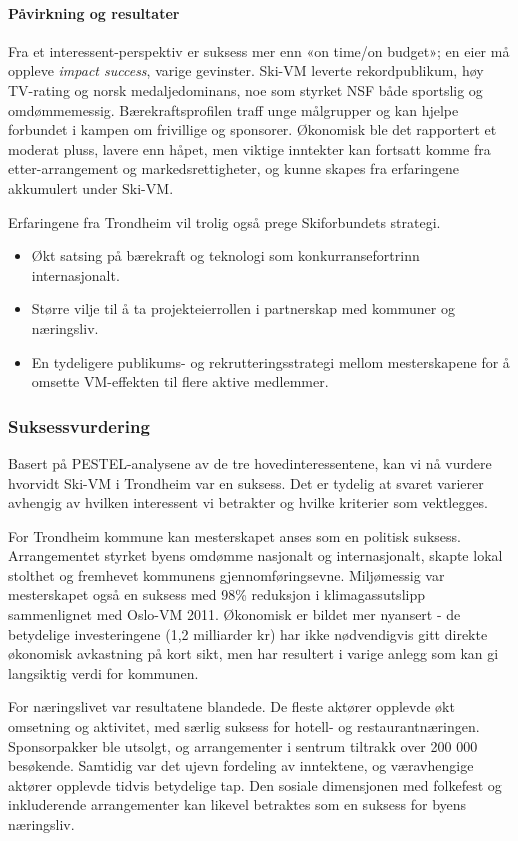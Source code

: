 \paragraph{Påvirkning og resultater}
Fra et interessent-perspektiv er suksess mer enn «on time/on budget»; en eier må
oppleve \textit{impact success}, varige gevinster. Ski-VM leverte rekordpublikum, høy TV-rating
og norsk medaljedominans, noe som styrket NSF både sportslig og omdømmemessig.
Bærekraftsprofilen traff unge målgrupper og kan hjelpe forbundet i kampen om frivillige og sponsorer.
Økonomisk ble det rapportert et moderat pluss, lavere enn håpet, men viktige inntekter kan
fortsatt komme fra etter-arrangement og markedsrettigheter, og kunne skapes fra erfaringene akkumulert under Ski-VM\cite{Trondheim2025Portal,Adresseavisen}.

Erfaringene fra Trondheim vil trolig også prege Skiforbundets strategi.
\begin{itemize}
    \item Økt satsing på bærekraft og teknologi som konkurransefortrinn internasjonalt.
    \item Større vilje til å ta projekteierrollen i partnerskap med kommuner og næringsliv.
    \item En tydeligere publikums- og rekrutteringsstrategi mellom mesterskapene for å omsette VM-effekten til flere aktive medlemmer.
\end{itemize}

\subsubsection{Suksessvurdering}
Basert på PESTEL-analysene av de tre hovedinteressentene, kan vi nå vurdere hvorvidt Ski-VM i Trondheim var en suksess. Det er tydelig at svaret varierer avhengig av hvilken interessent vi betrakter og hvilke kriterier som vektlegges.

For Trondheim kommune kan mesterskapet anses som en politisk suksess. Arrangementet styrket byens omdømme nasjonalt og internasjonalt, skapte lokal stolthet og fremhevet kommunens gjennomføringsevne. Miljømessig var mesterskapet også en suksess med 98\% reduksjon i klimagassutslipp sammenlignet med Oslo-VM 2011\cite{Trondheim2025Kutt}. Økonomisk er bildet mer nyansert - de betydelige investeringene (1,2 milliarder kr) har ikke nødvendigvis gitt direkte økonomisk avkastning på kort sikt, men har resultert i varige anlegg som kan gi langsiktig verdi for kommunen.

For næringslivet var resultatene blandede. De fleste aktører opplevde økt omsetning og aktivitet, med særlig suksess for hotell- og restaurantnæringen. Sponsorpakker ble utsolgt, og arrangementer i sentrum tiltrakk over 200 000 besøkende\parencite{wikipediaSkiVM}. Samtidig var det ujevn fordeling av inntektene, og væravhengige aktører opplevde tidvis betydelige tap\parencite{innherredTragedie}. Den sosiale dimensjonen med folkefest og inkluderende arrangementer kan likevel betraktes som en suksess for byens næringsliv.

